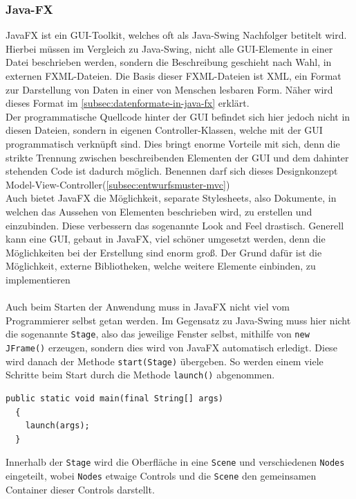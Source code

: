 \subsubsection{Java-FX}\label{sssec: JavaFX}
JavaFX ist ein GUI-Toolkit, welches oft als Java-Swing Nachfolger betitelt wird.
Hierbei müssen im Vergleich zu Java-Swing, nicht alle GUI-Elemente in einer Datei beschrieben werden, sondern die Beschreibung geschieht nach Wahl, in externen FXML-Dateien.
Die Basis dieser FXML-Dateien ist \acs{XML}, ein Format zur Darstellung von Daten in einer von Menschen lesbaren Form.
Näher wird dieses Format im \autoref{subsec:datenformate-in-java-fx} erklärt.\\
Der programmatische Quellcode hinter der GUI befindet sich hier jedoch nicht in diesen Dateien, sondern in eigenen Controller-Klassen, welche mit der GUI programmatisch verknüpft sind.
Dies bringt enorme Vorteile mit sich, denn die strikte Trennung zwischen beschreibenden Elementen der GUI und dem dahinter stehenden Code ist dadurch möglich.
Benennen darf sich dieses Designkonzept Model-View-Controller(\autoref{subsec:entwurfsmuster-mvc})\\
Auch bietet JavaFX die Möglichkeit, separate Stylesheets, also Dokumente, in welchen das Aussehen von Elementen beschrieben wird, zu erstellen und einzubinden.
Diese verbessern das sogenannte Look and Feel drastisch.
Generell kann eine GUI, gebaut in JavaFX, viel schöner umgesetzt werden, denn die Möglichkeiten bei der Erstellung sind enorm groß.
Der Grund dafür ist die Möglichkeit, externe Bibliotheken, welche weitere Elemente einbinden, zu implementieren\\\\
Auch beim Starten der Anwendung muss in JavaFX nicht viel vom Programmierer selbst getan werden.
Im Gegensatz zu Java-Swing muss hier nicht die sogenannte \lstinline[style=java]{Stage}, also das jeweilige Fenster selbst, mithilfe von \lstinline[style=java]{new JFrame()} erzeugen, sondern dies wird von JavaFX automatisch erledigt.
Diese wird danach der Methode \lstinline[style=java]{start(Stage)} übergeben.
So werden einem viele Schritte beim Start durch die Methode \lstinline[style=java]{launch()} abgenommen.
\begin{lstlisting}[style=java,caption=JavaFX Startvorgang,label=javafxStart]
  public static void main(final String[] args)
  {
    launch(args);
  }
\end{lstlisting}
Innerhalb der \lstinline[style=java]{Stage} wird die Oberfläche in eine \lstinline[style=java]{Scene} und verschiedenen \lstinline[style=java]{Nodes} eingeteilt, wobei \lstinline[style=java]{Nodes} etwaige Controls und die \lstinline[style=java]{Scene} den gemeinsamen Container dieser Controls darstellt.

